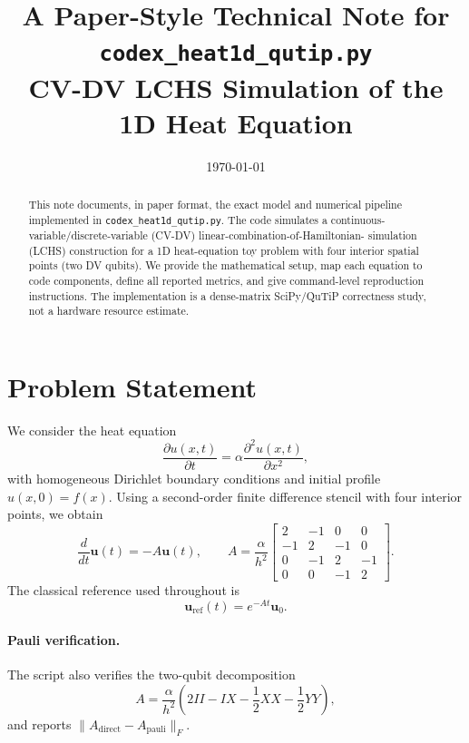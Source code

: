 \documentclass[11pt]{article}
\title{A Paper-Style Technical Note for \texttt{codex\_heat1d\_qutip.py}\\
CV-DV LCHS Simulation of the 1D Heat Equation}
\author{}
\date{\today}
\begin{document}
\maketitle

\begin{abstract}
This note documents, in paper format, the exact model and numerical pipeline
implemented in \texttt{codex\_heat1d\_qutip.py}. The code simulates a
continuous-variable/discrete-variable (CV-DV) linear-combination-of-Hamiltonian-
simulation (LCHS) construction for a 1D heat-equation toy problem with four
interior spatial points (two DV qubits). We provide the mathematical setup,
map each equation to code components, define all reported metrics, and give
command-level reproduction instructions.
The implementation is a dense-matrix SciPy/QuTiP correctness study, not a
hardware resource estimate.
\end{abstract}

\section{Problem Statement}
We consider the heat equation
\begin{equation}
\frac{\partial u(x,t)}{\partial t}=\alpha\frac{\partial^2u(x,t)}{\partial x^2},
\end{equation}
with homogeneous Dirichlet boundary conditions and initial profile $u(x,0)=f(x)$.
Using a second-order finite difference stencil with four interior points,
we obtain
\begin{equation}
\frac{d}{dt}\mathbf{u}(t)=-A\mathbf{u}(t),
\qquad
A=\frac{\alpha}{h^2}
\begin{bmatrix}
2 & -1 & 0 & 0 \\
-1 & 2 & -1 & 0 \\
0 & -1 & 2 & -1 \\
0 & 0 & -1 & 2
\end{bmatrix}.
\label{eq:heatA}
\end{equation}
The classical reference used throughout is
\begin{equation}
\mathbf{u}_{\mathrm{ref}}(t)=e^{-At}\mathbf{u}_0.
\label{eq:classical}
\end{equation}

\paragraph{Pauli verification.}
The script also verifies the two-qubit decomposition
\begin{equation}
A=\frac{\alpha}{h^2}\left(2II-IX-\frac12XX-\frac12YY\right),
\end{equation}
and reports $\lVert A_{\mathrm{direct}}-A_{\mathrm{pauli}}\rVert_F$.
\end{document}
